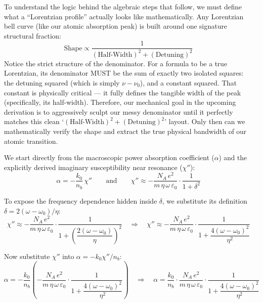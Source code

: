 \begin{keyinsight}
    To understand the logic behind the algebraic steps that follow, we must define what a ``Lorentzian profile'' actually looks like mathematically. Any Lorentzian bell curve (like our atomic absorption peak) is built around one signature structural fraction:
    \begin{equation*}
        \text{Shape} \propto \frac{1}{(\text{Half-Width})^2 + (\text{Detuning})^2}
    \end{equation*}
    Notice the strict structure of the denominator. For a formula to be a true Lorentzian, its denominator MUST be the sum of exactly two isolated squares: the detuning squared (which is simply $\nu - \nu_0$), and a constant squared. That constant is physically critical — it fully defines the tangible width of the peak (specifically, its half-width). Therefore, our mechanical goal in the upcoming derivation is to aggressively sculpt our messy denominator until it perfectly matches this clean `$(\text{Half-Width})^2 + (\text{Detuning})^2$' layout. Only then can we mathematically verify the shape and extract the true physical bandwidth of our atomic transition.
\end{keyinsight}
We start directly from the macroscopic power absorption coefficient ($\alpha$) and the explicitly derived imaginary susceptibility near resonance ($\chi''$):
\begin{equation*}
    \alpha = -\frac{k_0}{n_b}\,\chi'' \qquad \text{and} \qquad \chi'' \approx -\frac{N_A\,e^2}{m\,\eta\,\omega\,\varepsilon_0}\cdot\frac{1}{1 + \delta^2}
\end{equation*}

To expose the frequency dependence hidden inside $\delta$, we substitute its definition $\delta = 2(\omega - \omega_0)/\eta$:
\begin{equation*}
    \chi'' \approx -\frac{N_A\,e^2}{m\,\eta\,\omega\,\varepsilon_0}\cdot\frac{1}{1 + \left(\dfrac{2(\omega - \omega_0)}{\eta}\right)^2} \quad \Rightarrow \quad \chi'' \approx -\frac{N_A\,e^2}{m\,\eta\,\omega\,\varepsilon_0}\cdot\frac{1}{1 + \dfrac{4(\omega - \omega_0)^2}{\eta^2}}
\end{equation*}

Now substitute $\chi''$ into $\alpha = -k_0\chi''/n_b$:
\begin{equation*}
    \alpha = -\frac{k_0}{n_b}\left(-\frac{N_A\,e^2}{m\,\eta\,\omega\,\varepsilon_0}\cdot\frac{1}{1 + \dfrac{4(\omega - \omega_0)^2}{\eta^2}}\right) \quad \Rightarrow \quad \alpha = \frac{k_0}{n_b}\cdot\frac{N_A\,e^2}{m\,\eta\,\omega\,\varepsilon_0}\cdot\frac{1}{1 + \dfrac{4(\omega - \omega_0)^2}{\eta^2}}
\end{equation*}

